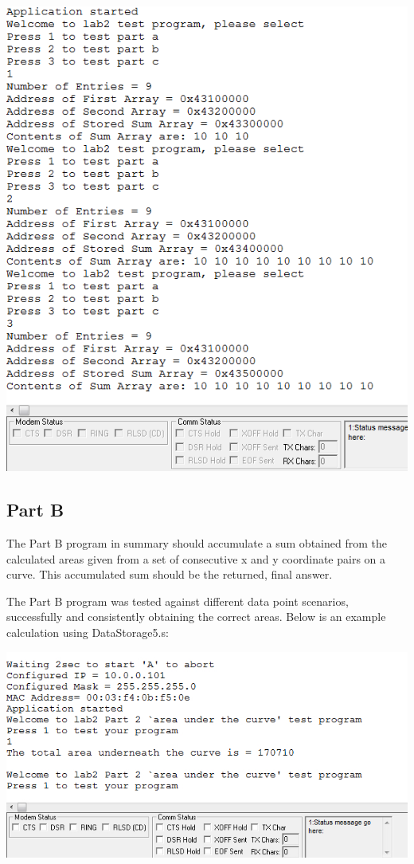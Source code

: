 \documentclass[12pt]{article}
\begin{document}
\begin{center}
\includegraphics[scale = 0.5]{./Lab2a.PNG}
\end{center}

\subsection{Part B}
The Part B program in summary should accumulate a sum obtained from the calculated areas given from a set of consecutive x and y coordinate pairs on a curve. This accumulated sum should be the returned, final answer.

The Part B program was tested against different data point scenarios, successfully and consistently obtaining the correct areas. Below is an example calculation using DataStorage5.s:

\begin{center}
\includegraphics[scale = 0.5]{Lab2/Lab2b.jpg}
\end{center}
\end{document}
